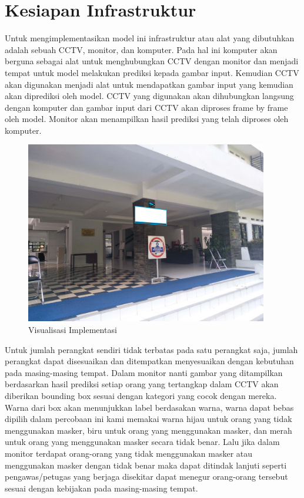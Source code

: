 \documentclass{article}
\begin{document}
	\section{Kesiapan Infrastruktur}
	\par Untuk mengimplementasikan model ini infrastruktur atau alat yang dibutuhkan adalah sebuah CCTV, monitor, dan komputer. Pada hal ini komputer akan berguna sebagai alat untuk menghubungkan CCTV dengan monitor dan menjadi tempat untuk model melakukan prediksi kepada gambar input. Kemudian CCTV akan digunakan menjadi alat untuk mendapatkan gambar input yang kemudian akan diprediksi oleh model. CCTV yang digunakan akan dihubungkan langsung dengan komputer dan gambar input dari CCTV akan diproses frame by frame oleh model. Monitor akan menampilkan hasil prediksi yang telah diproses oleh komputer.
  	\begin{figure}[H]
  		\centering
  		\includegraphics[width=400px]{implementasi/test.jpg}
  		\caption{Visualisasi Implementasi}
  	\end{figure}
	\par Untuk jumlah perangkat sendiri tidak terbatas pada satu perangkat saja, jumlah perangkat dapat disesuaikan dan ditempatkan menyesuaikan dengan kebutuhan pada masing-masing tempat. Dalam monitor nanti gambar yang ditampilkan berdasarkan hasil prediksi setiap orang yang tertangkap dalam CCTV akan diberikan bounding box sesuai dengan kategori yang cocok dengan mereka. Warna dari box akan menunjukkan label berdasakan warna, warna dapat bebas dipilih dalam percobaan ini kami memakai warna hijau untuk orang yang tidak menggunakan masker, biru untuk orang yang menggunakan masker, dan merah untuk orang yang menggunakan masker secara tidak benar. Lalu jika dalam monitor terdapat orang-orang yang tidak menggunakan masker atau menggunakan masker dengan tidak benar maka dapat ditindak lanjuti seperti pengawas/petugas yang berjaga disekitar dapat menegur orang-orang tersebut sesuai dengan kebijakan pada masing-masing tempat.
\end{document}
